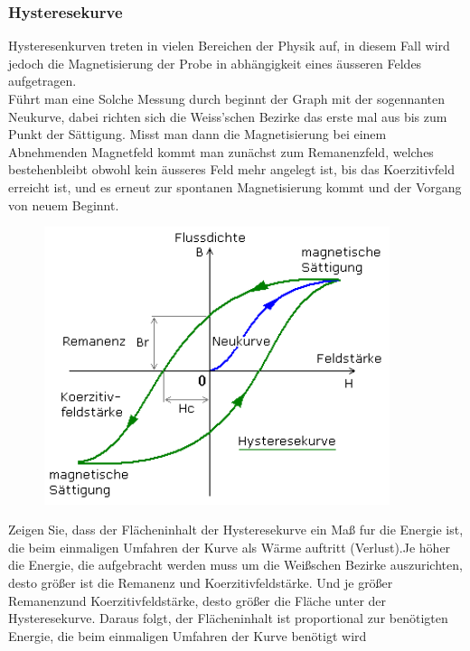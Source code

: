         \subsubsection*{Hysteresekurve}
            Hysteresenkurven treten in vielen Bereichen der Physik auf, in diesem Fall wird jedoch die Magnetisierung
            der Probe in abhängigkeit eines äusseren Feldes aufgetragen.\\
            Führt man eine Solche Messung durch beginnt der Graph mit der sogennanten Neukurve, dabei richten sich
            die Weiss'schen Bezirke das erste mal aus bis zum Punkt der Sättigung. Misst man dann die Magnetisierung bei einem Abnehmenden Magnetfeld
            kommt man zunächst zum Remanenzfeld, welches bestehenbleibt obwohl kein äusseres Feld mehr angelegt ist, bis 
            das Koerzitivfeld erreicht ist, und es erneut zur spontanen Magnetisierung kommt und der Vorgang von neuem Beginnt.
            \begin{figure}[H]
                \centering
                \includegraphics[width=0.9\textwidth]{Images/hyster.png}
            \end{figure}

            Zeigen Sie, dass der Flächeninhalt der Hysteresekurve ein Maß fur die Energie ist, die beim einmaligen Umfahren der Kurve als Wärme
            auftritt (Verlust).Je höher die Energie, die aufgebracht werden muss um die Weißschen Bezirke auszurichten, desto größer ist die
            Remanenz und Koerzitivfeldstärke. Und je größer Remanenzund Koerzitivfeldstärke, desto größer die Fläche unter der Hysteresekurve.
            Daraus folgt, der Flächeninhalt ist proportional zur benötigten Energie, die beim einmaligen Umfahren der Kurve benötigt wird
